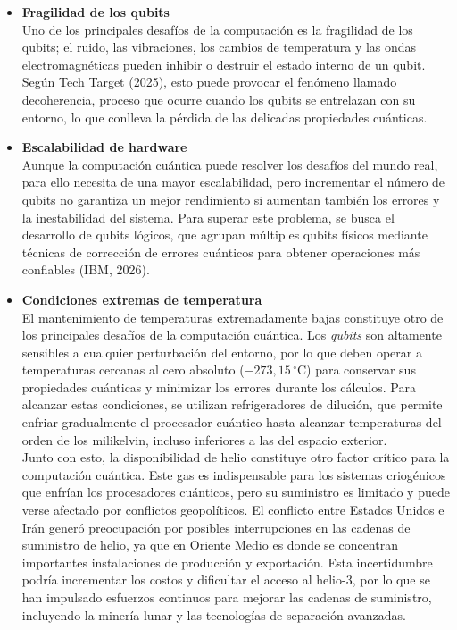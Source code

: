 \documentclass[12pt,a4paper]{article}
\begin{document}
\begin{itemize}
    \item \textbf{Fragilidad de los qubits}\\
    Uno de los principales desafíos de la computación es la fragilidad de los qubits; el ruido, las vibraciones, los cambios de temperatura y las ondas electromagnéticas pueden inhibir o destruir el estado interno de un qubit. Según Tech Target (2025), esto puede provocar el fenómeno llamado decoherencia, proceso que ocurre cuando los qubits se entrelazan con su entorno, lo que conlleva la pérdida de las delicadas propiedades cuánticas.
    \item \textbf{Escalabilidad de hardware}\\
    Aunque la computación cuántica puede resolver los desafíos del mundo real, para ello necesita de una mayor escalabilidad, pero incrementar el número de qubits no garantiza un mejor rendimiento si aumentan también los errores y la inestabilidad del sistema. Para superar este problema, se busca el desarrollo de qubits lógicos, que agrupan múltiples qubits físicos mediante técnicas de corrección de errores cuánticos para obtener operaciones más confiables (IBM, 2026).
    \item \textbf{Condiciones extremas de temperatura}\\
    El mantenimiento de temperaturas extremadamente bajas constituye otro de los principales desafíos de la computación cuántica. Los \textit{qubits} son altamente sensibles a cualquier perturbación del entorno, por lo que deben operar a temperaturas cercanas al cero absoluto ($-273,15\,^{\circ}\mathrm{C}$) para conservar sus propiedades cuánticas y minimizar los errores durante los cálculos. Para alcanzar estas condiciones, se utilizan refrigeradores de dilución, que permite enfriar gradualmente el procesador cuántico hasta alcanzar temperaturas del orden de los milikelvin, incluso inferiores a las del espacio exterior.\\
    Junto con esto, la disponibilidad de helio constituye otro factor crítico para la computación cuántica. Este gas es indispensable para los sistemas criogénicos que enfrían los procesadores cuánticos, pero su suministro es limitado y puede verse afectado por conflictos geopolíticos. El conflicto entre Estados Unidos e Irán generó preocupación por posibles interrupciones en las cadenas de suministro de helio, ya que en Oriente Medio es donde se concentran importantes instalaciones de producción y exportación. Esta incertidumbre podría incrementar los costos y dificultar el acceso al helio-3, por lo que se han impulsado esfuerzos continuos para mejorar las cadenas de suministro, incluyendo la minería lunar y las tecnologías de separación avanzadas.

\end{itemize}
\end{document}
